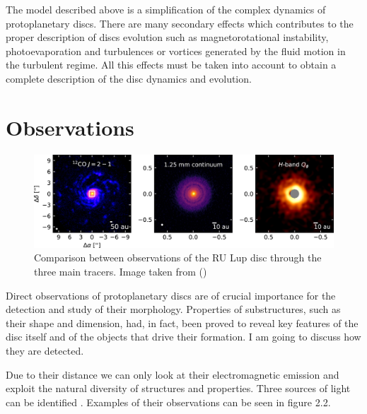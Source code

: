 \documentclass[a4paper,10pt]{report}
\begin{document}
The model described above is a simplification of the complex dynamics of protoplanetary discs. 
There are many secondary effects
which contributes to the proper description of discs evolution such as magnetorotational instability, photoevaporation and 
turbulences or vortices generated by the fluid motion in the turbulent regime. All 
this effects must be taken into account to obtain a complete description of the disc dynamics and evolution.

\section{Observations}

\begin{figure}
    \begin{center}
        \includegraphics[width=\textwidth]{images/2.2.tracers.comparison/apjaba1e1f9_hr.jpg}
    \end{center}
    \caption{Comparison between observations of the RU Lup disc through the three main tracers.
    Image taken from ()}
\end{figure}


Direct observations of protoplanetary discs are of crucial importance for the detection and study of their morphology.
Properties of substructures, such as their shape and dimension, had, in fact, 
been proved to reveal key features of the disc itself and
of the objects that drive their formation. I am going to discuss how they are detected.

Due to their distance we can only look at their electromagnetic emission
and exploit the natural diversity of structures and properties. 
Three sources of light can be identified \cite{disc_rev}. Examples of their
observations can be seen in figure 2.2.
\end{document}
